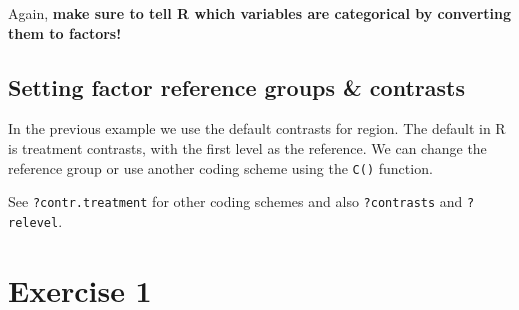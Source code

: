 \documentclass[]{book}
\newenvironment{Shaded}{\begin{snugshade}}{\end{snugshade}}
\newcommand{\KeywordTok}[1]{\textcolor[rgb]{0.13,0.29,0.53}{\textbf{#1}}}
\newcommand{\DataTypeTok}[1]{\textcolor[rgb]{0.13,0.29,0.53}{#1}}
\newcommand{\StringTok}[1]{\textcolor[rgb]{0.31,0.60,0.02}{#1}}
\newcommand{\CommentTok}[1]{\textcolor[rgb]{0.56,0.35,0.01}{\textit{#1}}}
\newcommand{\OperatorTok}[1]{\textcolor[rgb]{0.81,0.36,0.00}{\textbf{#1}}}
\newcommand{\NormalTok}[1]{#1}
\begin{document}
Again, \textbf{make sure to tell R which variables are categorical by
converting them to factors!}

\subsection{Setting factor reference groups \&
contrasts}\label{setting-factor-reference-groups-contrasts}

In the previous example we use the default contrasts for region. The
default in R is treatment contrasts, with the first level as the
reference. We can change the reference group or use another coding
scheme using the \texttt{C()} function.

\begin{Shaded}
\end{Shaded}

See \texttt{?contr.treatment} for other coding schemes and also
\texttt{?contrasts} and \texttt{?relevel}.

\section{Exercise 1}\label{exercise-1-1}
\end{document}
